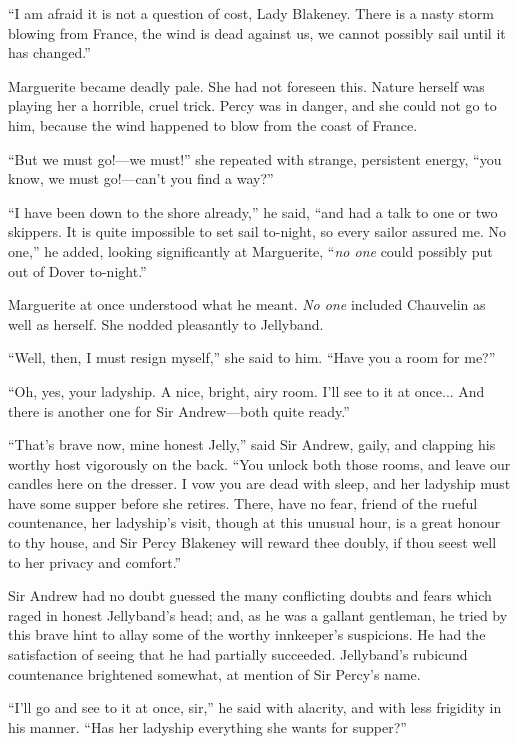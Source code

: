 \documentclass[paper=a5,BCOR=7mm,twoside,DIV=calc,12pt,usegeometry,chapterprefix,endperiod,headings=big]{scrbook}
\begin{document}
\enquote{I am afraid it is not a question of cost, Lady Blakeney. There is a nasty storm blowing from France, the wind is dead against us, we cannot possibly sail until it has changed.}

Marguerite became deadly pale. She had not foreseen this. Nature herself was playing her a horrible, cruel trick. Percy was in danger, and she could not go to him, because the wind happened to blow from the coast of France.

\enquote{But we must go!---we must!} she repeated with strange, persistent energy, \enquote{you know, we must go!---can't you find a way?}

\enquote{I have been down to the shore already,} he said, \enquote{and had a talk to one or two skippers. It is quite impossible to set sail to-night, so every sailor assured me. No one,} he added, looking significantly at Marguerite, \enquote{\textit{no one} could possibly put out of Dover to-night.}

Marguerite at once understood what he meant. \textit{No one} included Chauvelin as well as herself. She nodded pleasantly to Jellyband.

\enquote{Well, then, I must resign myself,} she said to him. \enquote{Have you a room for me?}

\enquote{Oh, yes, your ladyship. A nice, bright, airy room. I'll see to it at once... And there is another one for Sir Andrew---both quite ready.}

\enquote{That's brave now, mine honest Jelly,} said Sir Andrew, gaily, and clapping his worthy host vigorously on the back. \enquote{You unlock both those rooms, and leave our candles here on the dresser. I vow you are dead with sleep, and her ladyship must have some supper before she retires. There, have no fear, friend of the rueful countenance, her ladyship's visit, though at this unusual hour, is a great honour to thy house, and Sir Percy Blakeney will reward thee doubly, if thou seest well to her privacy and comfort.}

Sir Andrew had no doubt guessed the many conflicting doubts and fears which raged in honest Jellyband's head; and, as he was a gallant gentleman, he tried by this brave hint to allay some of the worthy innkeeper's suspicions. He had the satisfaction of seeing that he had partially succeeded. Jellyband's rubicund countenance brightened somewhat, at mention of Sir Percy's name.

\enquote{I'll go and see to it at once, sir,} he said with alacrity, and with less frigidity in his manner. \enquote{Has her ladyship everything she wants for supper?}
\end{document}
